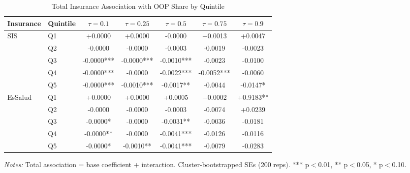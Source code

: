 \begin{table}[htbp]
\centering
\caption{Total Insurance Association with OOP Share by Quintile}
\label{tab:total_effect}
\small
\begin{tabular}{llccccc}
\toprule
Insurance & Quintile & $\tau=0.1$ & $\tau=0.25$ & $\tau=0.5$ & $\tau=0.75$ & $\tau=0.9$ \\
\midrule
  SIS & Q1 & +0.0000 & +0.0000 & -0.0000 & +0.0013 & +0.0047 \\
   & Q2 & -0.0000 & -0.0000 & -0.0003 & -0.0019 & -0.0023 \\
   & Q3 & -0.0000*** & -0.0000*** & -0.0010*** & -0.0023 & -0.0100 \\
   & Q4 & -0.0000*** & -0.0000 & -0.0022*** & -0.0052*** & -0.0060 \\
   & Q5 & -0.0000*** & -0.0010*** & -0.0017** & -0.0044 & -0.0147* \\
\midrule
  EsSalud & Q1 & +0.0000 & +0.0000 & +0.0005 & +0.0002 & +0.9183** \\
   & Q2 & -0.0000 & -0.0000 & -0.0003 & -0.0074 & +0.0239 \\
   & Q3 & -0.0000* & -0.0000 & -0.0031** & -0.0036 & -0.0181 \\
   & Q4 & -0.0000** & -0.0000 & -0.0041*** & -0.0126 & -0.0116 \\
   & Q5 & -0.0000* & -0.0010** & -0.0041*** & -0.0079 & -0.0283 \\
\bottomrule
\end{tabular}
\begin{minipage}{\textwidth}\footnotesize
\textit{Notes:} Total association = base coefficient + interaction.
Cluster-bootstrapped SEs (200 reps). *** p$<$0.01, ** p$<$0.05, * p$<$0.10.
\end{minipage}
\end{table}